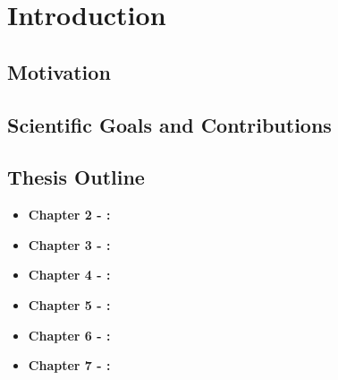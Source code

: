 \chapter{Introduction} %
\label{chap:Chapter1}  %


\section{Motivation}
\label{sec:Chapter1-1} 

\section{Scientific Goals and Contributions}
\label{sec:Chapter1-2} 

\section{Thesis Outline}
\label{sec:Chapter1-3} 

    \begin{itemize}
        \item \textbf{Chapter 2 - {\hypersetup{hidelinks}}:}
        \item \textbf{Chapter 3 - {\hypersetup{hidelinks}}:}
        \item \textbf{Chapter 4 - {\hypersetup{hidelinks}}:}                %
        \item \textbf{Chapter 5 - {\hypersetup{hidelinks}}:}       %
        \item \textbf{Chapter 6 - {\hypersetup{hidelinks}}:}
        \item \textbf{Chapter 7 - {\hypersetup{hidelinks}}:}
    \end{itemize}
